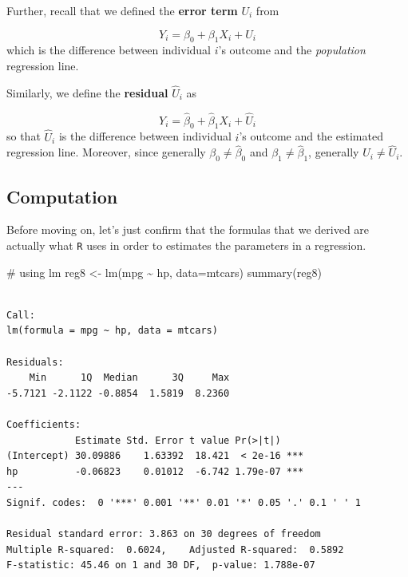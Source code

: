 \documentclass[
  letterpaper,
  DIV=11,
  numbers=noendperiod]{scrreprt}
\newenvironment{Shaded}{\begin{snugshade}}{\end{snugshade}}
\newcommand{\AttributeTok}[1]{\textcolor[rgb]{0.40,0.45,0.13}{#1}}
\newcommand{\CommentTok}[1]{\textcolor[rgb]{0.37,0.37,0.37}{#1}}
\newcommand{\FunctionTok}[1]{\textcolor[rgb]{0.28,0.35,0.67}{#1}}
\newcommand{\NormalTok}[1]{\textcolor[rgb]{0.00,0.23,0.31}{#1}}
\newcommand{\OtherTok}[1]{\textcolor[rgb]{0.00,0.23,0.31}{#1}}
\newcommand{\SpecialCharTok}[1]{\textcolor[rgb]{0.37,0.37,0.37}{#1}}
\begin{document}
Further, recall that we defined the \textbf{error term} \(U_i\) from

\[
  Y_i = \beta_0 + \beta_1 X_i + U_i
\] which is the difference between individual \(i\)'s outcome and the
\emph{population} regression line.

Similarly, we define the \textbf{residual} \(\hat{U}_i\) as

\[
  Y_i = \hat{\beta}_0 + \hat{\beta}_1 X_i + \hat{U}_i
\] so that \(\hat{U}_i\) is the difference between individual \(i\)'s
outcome and the estimated regression line. Moreover, since generally
\(\beta_0 \neq \hat{\beta}_0\) and \(\beta_1 \neq \hat{\beta}_1\),
generally \(U_i \neq \hat{U}_i\).

\subsection{Computation}\label{computation-7}

Before moving on, let's just confirm that the formulas that we derived
are actually what \texttt{R} uses in order to estimates the parameters
in a regression.

\begin{Shaded}
\begin{Highlighting}[]
\CommentTok{\# using lm}
\NormalTok{reg8 }\OtherTok{\textless{}{-}} \FunctionTok{lm}\NormalTok{(mpg }\SpecialCharTok{\textasciitilde{}}\NormalTok{ hp, }\AttributeTok{data=}\NormalTok{mtcars)}
\FunctionTok{summary}\NormalTok{(reg8)}
\end{Highlighting}
\end{Shaded}

\begin{verbatim}

Call:
lm(formula = mpg ~ hp, data = mtcars)

Residuals:
    Min      1Q  Median      3Q     Max 
-5.7121 -2.1122 -0.8854  1.5819  8.2360 

Coefficients:
            Estimate Std. Error t value Pr(>|t|)    
(Intercept) 30.09886    1.63392  18.421  < 2e-16 ***
hp          -0.06823    0.01012  -6.742 1.79e-07 ***
---
Signif. codes:  0 '***' 0.001 '**' 0.01 '*' 0.05 '.' 0.1 ' ' 1

Residual standard error: 3.863 on 30 degrees of freedom
Multiple R-squared:  0.6024,    Adjusted R-squared:  0.5892 
F-statistic: 45.46 on 1 and 30 DF,  p-value: 1.788e-07
\end{verbatim}
\end{document}

